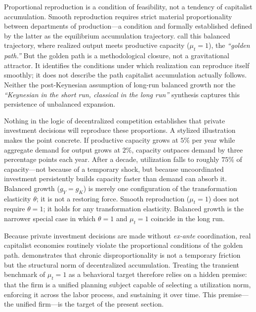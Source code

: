 Proportional reproduction is a condition of feasibility, not a
tendency of capitalist accumulation. Smooth reproduction requires
strict material proportionality between departments of
production---a condition \citet{Basu2022} and \citet{Okishio2022} formally established defined by the latter as the equilibrium accumulation trajectory. \citet{Bergmann2009} call
this balanced trajectory, where realized output meets productive
capacity ($\mu_t = 1$), the \textit{``golden path.''} But the golden path
is a methodological closure, not a gravitational attractor. It
identifies the conditions under which realization can reproduce
itself smoothly; it does not describe the path capitalist accumulation
actually follows. Neither the post-Keynesian assumption of long-run balanced
growth \citep{BleckerSetterfield2019} nor the \textit{``Keynesian in the short run, classical in the long run''} synthesis \citep{DumenilLevy1999} captures this persistence of unbalanced expansion.

Nothing in the logic of decentralized competition
establishes that private investment decisions will reproduce
these proportions. A stylized illustration makes the point
concrete. If productive capacity grows at $5\%$ per year while
aggregate demand for output grows at $2\%$, capacity outpaces
demand by three percentage points each year. After a decade,
utilization falls to roughly $75\%$ of capacity---not because
of a temporary shock, but because uncoordinated investment
persistently builds capacity faster than demand can absorb it.
Balanced growth ($g_Y = g_K$) is merely one configuration of
the transformation elasticity $\theta$; it is not a restoring
force. Smooth reproduction ($\mu_t = 1$) does not require
$\theta = 1$; it holds for any transformation elasticity.
Balanced growth is the narrower special case in which
$\theta = 1$ and $\mu_t = 1$ coincide in the long run.

Because private investment decisions are made without
\textit{ex-ante} coordination, real capitalist economies
routinely violate the proportional conditions of the golden path.
\citet{Okishio2022} demonstrates that chronic disproportionality
is not a temporary friction but the structural norm of
decentralized accumulation. Treating the transient benchmark of
$\mu_t = 1$ as a behavioral target therefore relies on a hidden
premise: that the firm is a unified planning subject capable of
selecting a utilization norm, enforcing it across the labor
process, and sustaining it over time. This premise---the unified
firm---is the target of the present section.

